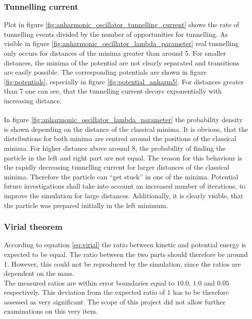 \documentclass{scrartcl}
\begin{document}
	\subsubsection{Tunnelling current}
		Plot in figure \ref{fig:anharmonic_oscillator_tunnelling_current} shows the rate of tunnelling events divided by the number of opportunities for tunnelling.
		As visible in figure \ref{fig:anharmonic_oscillator_lambda_parameter} real tunnelling only occurs for distances of the minima greater than around 5.
		For smaller distances, the minima of the potential are not clearly separated and transitions are easily possible.
		The corresponding potentials are shown in figure \ref{fig:potentials}, especially in figure \ref{fig:potential_anharm5}.
		For distances greater than 7 one can see, that the tunnelling current decays exponentially with increasing distance.
		\\
		\\
		In figure \ref{fig:anharmonic_oscillator_lambda_parameter} the probability density is shown depending on the distance of the classical minima.
		It is obvious, that the distributions for both minima are centred around the positions of the classical minima.
		For higher distance above around 8, the probability of finding the particle in the left and right part are not equal.
		The reason for this behaviour is the rapidly decreasing tunnelling current for larger distances of the classical minima.
		Therefore the particle can \enquote{get stuck} in one of the minima.
		Potential future investigations shall take into account an increased number of iterations, to improve the simulation for large distances.
		Additionally, it is clearly visible, that the particle was prepared initially in the left minimum.

	\subsubsection{Virial theorem}
		According to equation \ref{eq:virial} the ratio between kinetic and potential energy is expected to be equal.
		The ratio between the two parts should therefore be around 1.
		However, this could not be reproduced by the simulation, since the ratios are dependent on the mass.
		\\
		The measured ratios are within error boundaries equal to $10.0$, $1.0$ and $0.05$ respectively.
		This deviation from the expected ratio of 1 has to be therefore assessed as very significant.
		The scope of this project did not allow further examinations on this very item.
\end{document}
